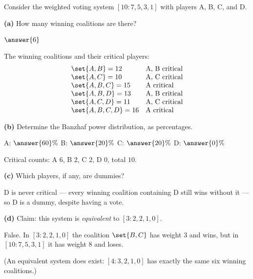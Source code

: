 \documentclass[12pt]{ximera}
\begin{document}
\begin{problem}
Consider the weighted voting system $[10:7,5,3,1]$ with players A, B, C, and D.

\begin{prompt}
\textbf{(a)} How many winning coalitions are there?

$\answer{6}$

\begin{feedback}
The winning coalitions and their critical players:
\[
\begin{array}{ll}
\set{A,B}=12 & \text{A, B critical}\\
\set{A,C}=10 & \text{A, C critical}\\
\set{A,B,C}=15 & \text{A critical}\\
\set{A,B,D}=13 & \text{A, B critical}\\
\set{A,C,D}=11 & \text{A, C critical}\\
\set{A,B,C,D}=16 & \text{A critical}
\end{array}
\]
\end{feedback}
\end{prompt}

\begin{prompt}
\textbf{(b)} Determine the Banzhaf power distribution, as percentages.

A: $\answer{60}\%$ \quad B: $\answer{20}\%$ \quad C: $\answer{20}\%$ \quad D: $\answer{0}\%$

\begin{feedback}
Critical counts: A $6$, B $2$, C $2$, D $0$, total $10$.
\end{feedback}
\end{prompt}

\begin{prompt}
\textbf{(c)} Which players, if any, are dummies?

\begin{selectAll}
\end{selectAll}

\begin{feedback}
D is never critical --- every winning coalition containing D still wins without it ---
so D is a dummy, despite having a vote.
\end{feedback}
\end{prompt}

\begin{prompt}
\textbf{(d)} Claim: this system is \emph{equivalent} to $[3:2,2,1,0]$.

\begin{multipleChoice}
\end{multipleChoice}

\begin{feedback}
False. In $[3:2,2,1,0]$ the coalition $\set{B,C}$ has weight $3$ and wins, but in
$[10:7,5,3,1]$ it has weight $8$ and loses.

(An equivalent system does exist: $[4:3,2,1,0]$ has exactly the same six winning
coalitions.)
\end{feedback}
\end{prompt}
\end{problem}
\end{document}
